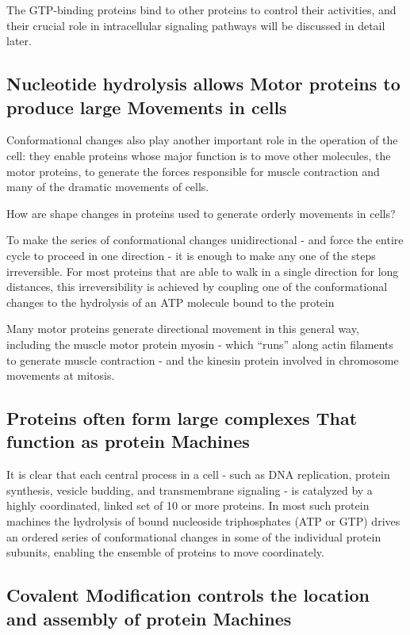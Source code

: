 The GTP-binding proteins bind to other proteins to
control their activities, and their crucial role in intracellular signaling
pathways will be discussed in detail later.

\subsection{Nucleotide hydrolysis allows Motor proteins to produce large Movements in cells}

Conformational changes also play another important role in the operation of the cell: they enable
proteins whose major function is to move other molecules, the motor
proteins, to generate the forces responsible for muscle contraction and
many of the dramatic movements of cells.

How are shape changes in proteins used to generate orderly movements
in cells?

To make the series of conformational changes unidirectional - and force
the entire cycle to proceed in one direction - it is enough to make any
one of the steps irreversible. For most proteins that are able to walk in
a single direction for long distances, this irreversibility is achieved by
coupling one of the conformational changes to the hydrolysis of an ATP
molecule bound to the protein

Many motor proteins generate directional movement in this general way,
including the muscle motor protein myosin - which “runs” along actin
filaments to generate muscle contraction - and
the kinesin protein involved in chromosome movements at mitosis.

\subsection{Proteins often form large complexes That function as protein Machines}

It is clear that each central process in
a cell - such as DNA replication, protein synthesis, vesicle budding, and
transmembrane signaling - is catalyzed by a highly coordinated, linked
set of 10 or more proteins. In most such protein machines the hydrolysis
of bound nucleoside triphosphates (ATP or GTP) drives an ordered series
of conformational changes in some of the individual protein subunits,
enabling the ensemble of proteins to move coordinately.

\subsection{Covalent Modification controls the location and assembly of protein Machines}

